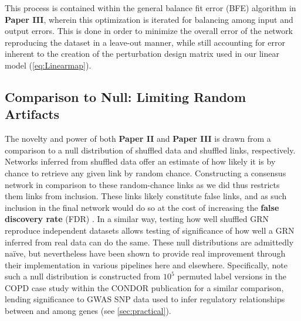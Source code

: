 This process is contained within the general balance fit error (BFE) algorithm in \textbf{Paper III}, wherein this optimization is iterated for balancing among input and output errors. This is done in order to minimize the overall error of the network reproducing the dataset in a leave-out manner, while still accounting for error inherent to the creation of the perturbation design matrix used in our linear model (\cref{eq:Linearmap}).

\subsection{Comparison to Null: Limiting Random Artifacts}
\label{sec:null}
The novelty and power of both \textbf{Paper II} and \textbf{Paper III} is drawn from a comparison to a null distribution of shuffled data and shuffled links, respectively. Networks inferred from shuffled data offer an estimate of how likely it is by chance to retrieve any given link by random chance. Constructing a consensus network in comparison to these random-chance links as we did thus restricts them links from inclusion. These links likely constitute false links, and as such inclusion in the final network would do so at the cost of increasing the \textbf{false discovery rate} (FDR) \citep{kall2007posterior}. In a similar way, testing how well shuffled GRN reproduce independent datasets allows testing of significance of how well a GRN inferred from real data can do the same. These null distributions are admittedly na{\"i}ve, but nevertheless have been shown to provide real improvement through their implementation in various pipelines here and elsewhere. Specifically, note such a null distribution is constructed from $10^5$ permuted label versions \cite{platig2016bipartite} in the COPD case study within the CONDOR publication for a similar comparison, lending significance to GWAS SNP data used to infer regulatory relationships between and among genes (see \cref{sec:practical}).